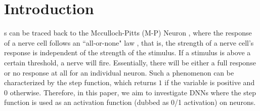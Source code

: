 \documentclass[journal]{IEEEtran}
\begin{document}
\IEEEpeerreviewmaketitle


\section{Introduction}
s can be traced back to the Mcculloch-Pitts (M-P) Neuron \cite{Mcculloch1943}, where the response of a nerve cell follows an ``all-or-none" law \cite{Britannica2019}, that is, the strength of a nerve cell's response is independent of the strength of the stimulus. If a stimulus is above a certain threshold, a nerve will fire. Essentially, there will be either a full response or no response at all for an individual neuron. Such a phenomenon can be characterized by the step function, which returns $1$ if the variable is positive and $0$ otherwise. Therefore, in this paper, we aim to investigate DNNs where the step function is used as an activation function (dubbed as 0/1 activation) on neurons.
\end{document}
